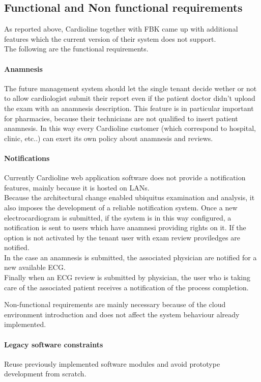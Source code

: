 \subsection{Functional and Non functional requirements} As reported above, Cardioline together with FBK came up with additional features which the current version of their system does not support.\\The following are the functional requirements.
\paragraph{Anamnesis}The future management system should let the single tenant decide wether or not to allow cardiologist submit their report even if the patient doctor didn't upload the exam with an anamnesis description. This feature is in particular important for pharmacies, because their technicians are not qualified to insert patient anamnesis. In this way every Cardioline customer (which correspond to hospital, clinic, etc..) can exert its own policy about anamnesis and reviews.
\paragraph{Notifications}Currently Cardioline web application software does not provide a notification features, mainly because it is hosted on LANs.\\Because the architectural change enabled ubiquitus examination and analysis, it also imposes the development of a reliable notification system. Once a new electrocardiogram is submitted, if the system is in this way configured, a notification is sent to users which have anamnesi providing rights on it. If the option is not activated by the tenant user with exam review proviledges are notified.\\In the case an anamnesis is submitted, the associated physician are notified for a new available ECG.\\Finally when an ECG review is submitted by physician, the user who is taking care of the associated patient receives a notification of the process completion.

Non-functional requirements are mainly necessary because of the cloud environment introduction and does not affect the system behaviour already implemented.

\paragraph{Legacy software constraints}
Reuse previously implemented software modules and avoid prototype development from scratch.
